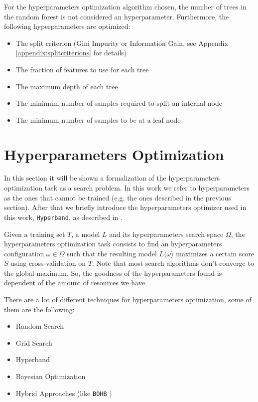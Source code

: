 \documentclass[11pt, a4paper]{article}
\begin{document}
    For the hyperparameters optimization algorithm chosen, the number of trees in the random forest is not considered an hyperparameter.
    Furthermore, the following hyperparameters are optimized:
    \begin{itemize}
      \item The split criterion (Gini Impurity or Information Gain, see Appendix \ref{appendix:splitcriterions} for details)
      \item The fraction of features to use for each tree
      \item The maximum depth of each tree
      \item The minimum number of samples required to split an internal node
      \item The minimum number of samples to be at a leaf node
    \end{itemize}

\section{Hyperparameters Optimization}
  In this section it will be shown a formalization of the hyperparameters optimization task as a search problem.
  In this work we refer to hyperparameters as the ones that cannot be trained (e.g. the ones described in the previous section).
  After that we briefly introduce the hyperparameters optimizer used in this work, \texttt{Hyperband}, as described in \cite{hyperband}.

  Given a training set $T$, a model $L$ and its hyperparameters search space $\Omega$, the hyperparameters optimization task consists to find an hyperparameters configuration $\omega \in \Omega$ such that the resulting model $L\langle\omega\rangle$ maximizes a certain score $S$ using cross-validation on $T$.
  Note that most search algorithms don't converge to the global maximum.
  So, the goodness of the hyperparameters found is dependent of the amount of resources we have.

  There are a lot of different techniques for hyperparameters optimization, some of them are the following:
  \begin{itemize}
    \item Random Search
    \item Grid Search
    \item Hyperband
    \item Bayesian Optimization
    \item Hybrid Approaches (like \texttt{BOHB} \cite{bohb})
  \end{itemize}
\end{document}

